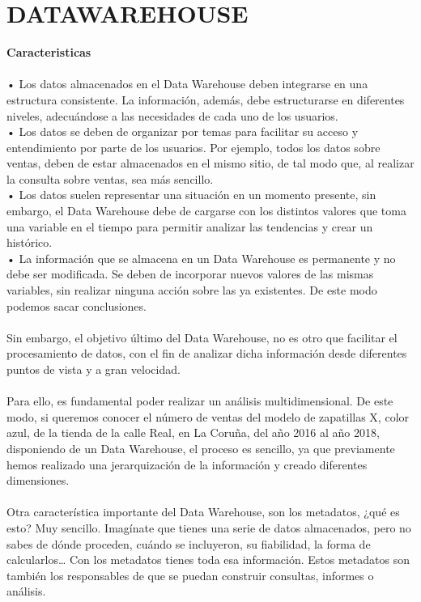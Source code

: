\section{DATAWAREHOUSE}
\item{
\textbf{Caracteristicas}\\\\
•	Los datos almacenados en el Data Warehouse deben integrarse en una estructura consistente. La información, además, debe estructurarse en diferentes niveles, adecuándose a las necesidades de cada uno de los usuarios.\\
•	Los datos se deben de organizar por temas para facilitar su acceso y entendimiento por parte de los usuarios. Por ejemplo, todos los datos sobre ventas, deben de estar almacenados en el mismo sitio, de tal modo que, al realizar la consulta sobre ventas, sea más sencillo.\\
•	Los datos suelen representar una situación en un momento presente, sin embargo, el Data Warehouse debe de cargarse con los distintos valores que toma una variable en el tiempo para permitir analizar las tendencias y crear un histórico.\\
•	La información que se almacena en un Data Warehouse es permanente y no debe ser modificada. Se deben de incorporar nuevos valores de las mismas variables, sin realizar ninguna acción sobre las ya existentes. De este modo podemos sacar conclusiones.\\\\
Sin embargo, el objetivo último del Data Warehouse, no es otro que facilitar el procesamiento de datos, con el fin de analizar dicha información desde diferentes puntos de vista y a gran velocidad.\\\\
Para ello, es fundamental poder realizar un análisis multidimensional. De este modo, si queremos conocer el número de ventas del modelo de zapatillas X, color azul, de la tienda de la calle Real, en La Coruña, del año 2016 al año 2018, disponiendo de un Data Warehouse, el proceso es sencillo, ya que previamente hemos realizado una jerarquización de la información y creado diferentes dimensiones.\\\\
Otra característica importante del Data Warehouse, son los metadatos, ¿qué es esto? Muy sencillo. Imagínate que tienes una serie de datos almacenados, pero no sabes de dónde proceden, cuándo se incluyeron, su fiabilidad, la forma de calcularlos… Con los metadatos tienes toda esa información. Estos metadatos son también los responsables de que se puedan construir consultas, informes o análisis.

}

